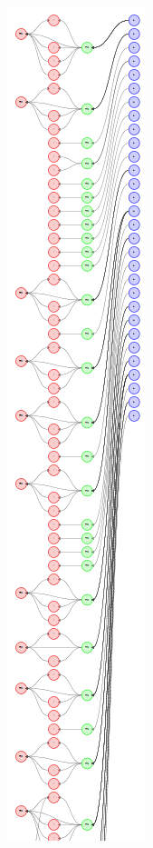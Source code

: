 \begin{figure}
\centering
\begin{minipage}[b]{.30\textwidth}
  \centering
  \includegraphics[scale=0.5]{./figures/speechacts/youtube.png}
\end{minipage}
\hspace{.05\textwidth}
\begin{minipage}[b]{.30\textwidth}
  \centering

\end{minipage}
\end{figure}

